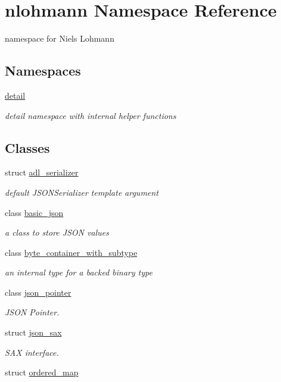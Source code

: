 \hypertarget{namespacenlohmann}{}\section{nlohmann Namespace Reference}
\label{namespacenlohmann}


namespace for Niels Lohmann  


\subsection*{Namespaces}
\begin{DoxyCompactItemize}
\item 
 \hyperlink{namespacenlohmann_1_1detail}{detail}
\begin{DoxyCompactList}\small\item\em detail namespace with internal helper functions \end{DoxyCompactList}\end{DoxyCompactItemize}
\subsection*{Classes}
\begin{DoxyCompactItemize}
\item 
struct \hyperlink{structnlohmann_1_1adl__serializer}{adl\+\_\+serializer}
\begin{DoxyCompactList}\small\item\em default J\+S\+O\+N\+Serializer template argument \end{DoxyCompactList}\item 
class \hyperlink{classnlohmann_1_1basic__json}{basic\+\_\+json}
\begin{DoxyCompactList}\small\item\em a class to store J\+S\+ON values \end{DoxyCompactList}\item 
class \hyperlink{classnlohmann_1_1byte__container__with__subtype}{byte\+\_\+container\+\_\+with\+\_\+subtype}
\begin{DoxyCompactList}\small\item\em an internal type for a backed binary type \end{DoxyCompactList}\item 
class \hyperlink{classnlohmann_1_1json__pointer}{json\+\_\+pointer}
\begin{DoxyCompactList}\small\item\em J\+S\+ON Pointer. \end{DoxyCompactList}\item 
struct \hyperlink{structnlohmann_1_1json__sax}{json\+\_\+sax}
\begin{DoxyCompactList}\small\item\em S\+AX interface. \end{DoxyCompactList}\item 
struct \hyperlink{structnlohmann_1_1ordered__map}{ordered\+\_\+map}
\end{DoxyCompactItemize}
